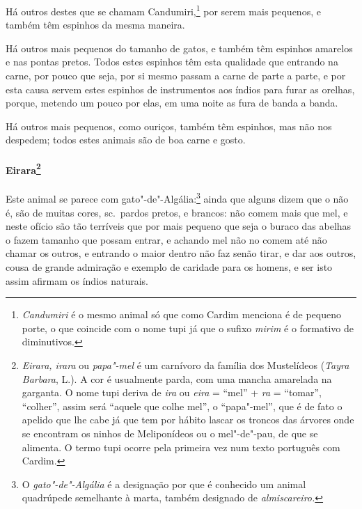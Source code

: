  Há outros destes que se chamam Candumiri,\footnote{ \textit{Candumiri} 
é o mesmo animal só que como Cardim menciona é de pequeno porte, o
que coincide com o nome tupi já que o sufixo \textit{mirim} é o
formativo de diminutivos.} por serem mais pequenos, e também
têm espinhos da mesma maneira.


 Há outros mais pequenos do tamanho de gatos, e também têm espinhos
amarelos e nas pontas pretos. Todos estes espinhos têm esta qualidade
que entrando na carne, por pouco que seja, por si mesmo passam a carne
de parte a parte, e por esta causa servem estes espinhos de
instrumentos aos índios para furar as orelhas, porque, metendo um pouco
por elas, em uma noite as fura de banda a banda.

 Há outros mais pequenos, como ouriços, também têm espinhos, mas não nos
despedem; todos estes animais são de boa carne e gosto. 

\paragraph{Eirara\footnote{ \textit{Eirara, irara} ou
\textit{papa"-mel} é um carnívoro da família dos Mustelídeos
(\textit{Tayra Barbara}, L.). A cor é usualmente parda, com uma mancha
amarelada na garganta. O nome tupi deriva de \textit{ira} ou
\textit{eira} = ``mel'' + \textit{ra} = ``tomar'', ``colher'', assim será ``aquele 
que colhe mel'', o ``papa"-mel'', que é de fato o apelido que 
lhe cabe já que tem por hábito lascar os troncos das árvores onde se
encontram os ninhos de Meliponídeos ou o mel"-de"-pau, de que se
alimenta. O termo tupi ocorre pela primeira vez num texto português com
Cardim.}} Este animal se parece com gato"-de"-Algália:\footnote{ O 
\textit{gato"-de"-Algália} é a designação por que é conhecido um animal
quadrúpede semelhante à marta, também designado de
\textit{almiscareiro.}} ainda que alguns dizem que o não é, são de
muitas cores, sc.~pardos pretos, e brancos: não comem mais que mel, e
neste ofício são tão terríveis que por mais pequeno que seja o buraco
das abelhas o fazem tamanho que possam entrar, e achando mel não no
comem até não chamar os outros, e entrando o maior dentro não faz senão
tirar, e dar aos outros, cousa de grande admiração e exemplo de
caridade para os homens, e ser isto assim afirmam os índios naturais.

